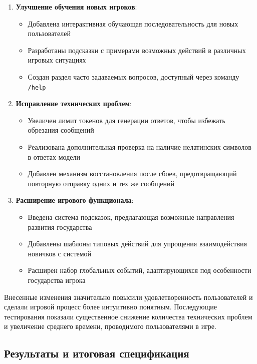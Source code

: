 \begin{enumerate}
\item \textbf{Улучшение обучения новых игроков}:
\begin{itemize}
\item Добавлена интерактивная обучающая последовательность для новых пользователей
\item Разработаны подсказки с примерами возможных действий в различных игровых ситуациях
\item Создан раздел часто задаваемых вопросов, доступный через команду \texttt{/help}
\end{itemize}

\item \textbf{Исправление технических проблем}:
\begin{itemize}
    \item Увеличен лимит токенов для генерации ответов, чтобы избежать обрезания сообщений
    \item Реализована дополнительная проверка на наличие нелатинских символов в ответах модели
    \item Добавлен механизм восстановления после сбоев, предотвращающий повторную отправку одних и тех же сообщений
\end{itemize}

\item \textbf{Расширение игрового функционала}:
\begin{itemize}
    \item Введена система подсказок, предлагающая возможные направления развития государства
    \item Добавлены шаблоны типовых действий для упрощения взаимодействия новичков с системой
    \item Расширен набор глобальных событий, адаптирующихся под особенности государства игрока
\end{itemize}
\end{enumerate}

Внесенные изменения значительно повысили удовлетворенность пользователей и сделали игровой процесс более интуитивно понятным. Последующие тестирования показали существенное снижение количества технических проблем и увеличение среднего времени, проводимого пользователями в игре.

\subsection{Результаты и итоговая спецификация}

